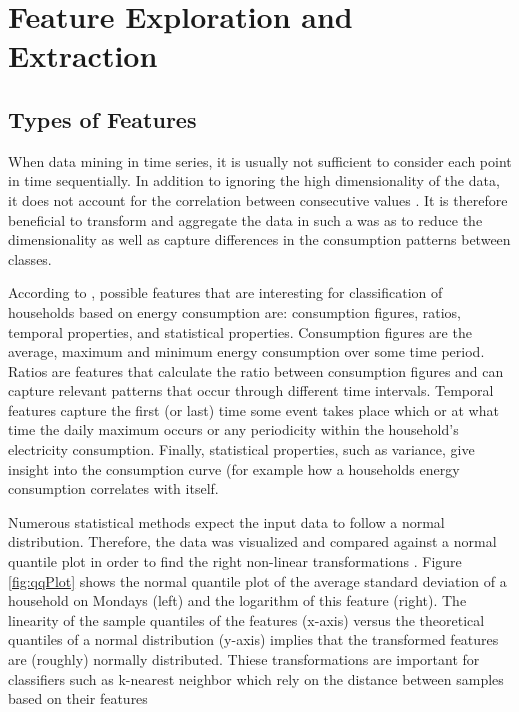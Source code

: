 \chapter{Feature Exploration and Extraction}

\section{Types of Features}
When data mining in time series, it is usually not sufficient to consider each point in time sequentially. In addition to ignoring the high dimensionality of the data,  it does not account for the correlation between consecutive values \cite{Moerchen}. It is therefore beneficial to transform and aggregate the data in such a was as to reduce the dimensionality as well as capture differences in the consumption patterns between classes. 

According to \cite{Beckel 2}, possible features that are interesting for classification of households based on energy consumption are: consumption figures, ratios, temporal properties, and statistical properties. Consumption figures are the average, maximum and minimum energy consumption over some time period. Ratios are features that calculate the ratio between consumption figures and can capture relevant patterns that occur through different time intervals. Temporal features capture the first (or last) time some event takes place which or at what time the daily maximum occurs or any periodicity within the household's electricity consumption. Finally, statistical properties, such as variance, give insight into the consumption curve (for example how a households energy consumption correlates with itself.

Numerous statistical methods expect the input data to follow a normal distribution. Therefore, the data was visualized and compared against a normal quantile plot in order to find the right non-linear transformations \cite{Osborne}\cite{Wang}. Figure \ref{fig:qqPlot} shows the normal quantile plot of the average standard deviation of a household on Mondays (left) and the logarithm of this feature (right). The linearity of the sample quantiles of the features (x-axis) versus the theoretical quantiles of a normal distribution (y-axis) implies that the transformed features are (roughly) normally distributed. Thiese transformations are important for classifiers such as k-nearest neighbor which rely on the distance between samples based on their features

\qqPlot

